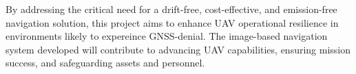 By addressing the critical need for a drift-free, cost-effective, and emission-free navigation solution, this project aims to enhance UAV operational resilience in environments likely to expereince GNSS-denial. The image-based navigation system developed will contribute to advancing UAV capabilities, ensuring mission success, and safeguarding assets and personnel.





